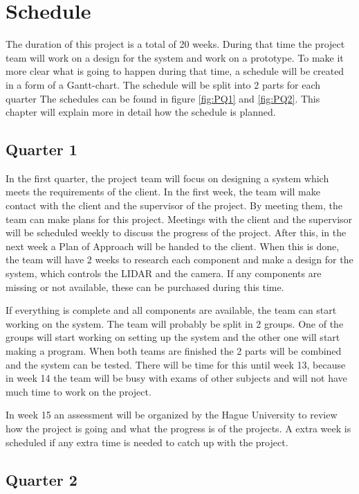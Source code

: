 \chapter{Schedule}
\justify
The duration of this project is a total of 20 weeks. During that time the project team will work on a design for the system and work on a prototype. To make it more clear what is going to happen during that time, a schedule will be created in a form of a Gantt-chart. The schedule will be split into 2 parts for each quarter The schedules can be found in figure \ref{fig:PQ1} and \ref{fig:PQ2}. This chapter will explain more in detail how the schedule is planned.

\section{Quarter 1}
\justify

In the first quarter, the project team will focus on designing a system which meets the requirements of the client. In the first week, the team will make contact with the client and the supervisor of the project. By meeting them, the team can make plans for this project. Meetings with the client and the supervisor will be scheduled weekly to discuss the progress of the project. After this, in the next week a Plan of Approach will be handed to the client. When this is done, the team will have 2 weeks to research each component and make a design for the system, which controls the LIDAR and the camera. If any components are missing or not available, these can be purchased during this time.

\justify
If everything is complete and all components are available, the team can start working on the system. The team will probably be split in 2 groups. One of the groups will start working on setting up the system and the other one will start making a program. When both teams are finished the 2 parts will be combined and the system can be tested. There will be time for this until week 13, because in week 14 the team will be busy with exams of other subjects and will not have much time to work on the project.

\justify
In week 15 an assessment will be organized by the Hague University to review how the project is going and what the progress is of the projects. A extra week is scheduled if any extra time is needed to catch up with the project.

\section{Quarter 2}

